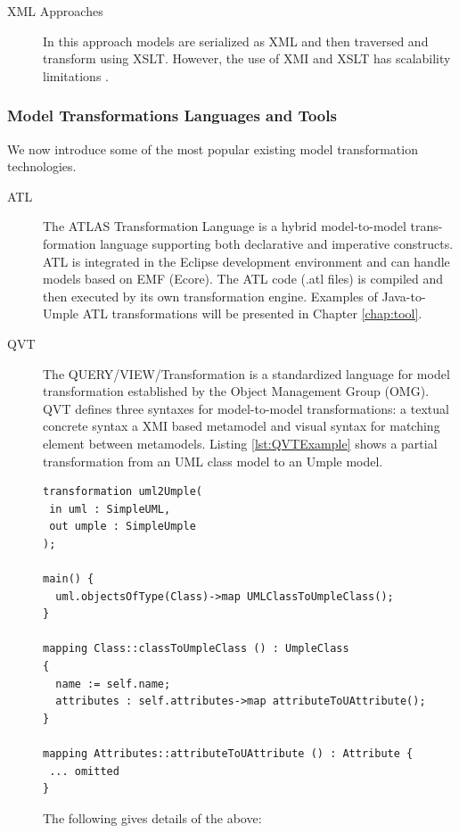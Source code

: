 \begin{description}
\item[XML Approaches]
In this approach models are serialized as XML and then traversed and transform using XSLT. However, the use of XMI and XSLT has scalability limitations \cite{peltier2001mtrans}. 
\end{description}

\subsubsection{Model Transformations Languages and Tools}

We now introduce some of the most popular existing model transformation technologies.

\begin{description}
\item[ATL]
The ATLAS Transformation Language \cite{atl} is a hybrid model-to-model trans-formation language supporting both declarative and imperative constructs. ATL is integrated in the Eclipse development environment and can handle models based on EMF (Ecore). The ATL code (.atl files) is compiled and then executed by its own transformation engine. Examples of Java-to-Umple ATL transformations will be presented in Chapter \ref{chap:tool}.

\item[QVT]
The QUERY/VIEW/Transformation \cite{QVTMain} is a standardized language for model transformation established by the Object Management Group (OMG). QVT defines three syntaxes for model-to-model transformations: a textual concrete syntax a XMI based metamodel and visual syntax for matching element between metamodels.
Listing \ref{lst:QVTExample} shows a partial transformation from an UML class model to an Umple model.

\begin{lstlisting}[style=java,label=lst:QVTExample, caption=A basic QVT transformation]
transformation uml2Umple(
 in uml : SimpleUML,
 out umple : SimpleUmple
);

main() {
  uml.objectsOfType(Class)->map UMLClassToUmpleClass();
}

mapping Class::classToUmpleClass () : UmpleClass
{
  name := self.name;
  attributes : self.attributes->map attributeToUAttribute();
}

mapping Attributes::attributeToUAttribute () : Attribute {
 ... omitted
}
\end{lstlisting}

The following gives details of the above:


\end{description}
